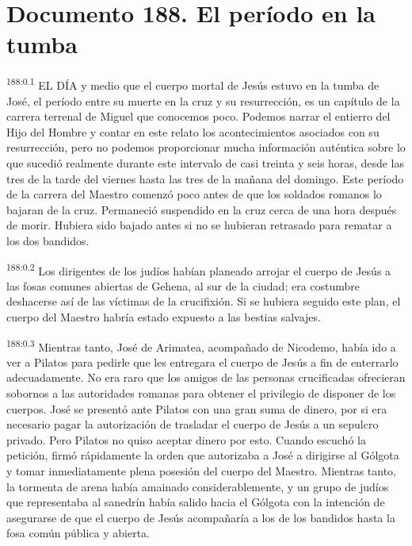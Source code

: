 \chapter{Documento 188. El período en la tumba}
\par 
\textsuperscript{188:0.1} EL DÍA y medio que el cuerpo mortal de Jesús estuvo en la tumba de José, el período entre su muerte en la cruz y su resurrección, es un capítulo de la carrera terrenal de Miguel que conocemos poco. Podemos narrar el entierro del Hijo del Hombre y contar en este relato los acontecimientos asociados con su resurrección, pero no podemos proporcionar mucha información auténtica sobre lo que sucedió realmente durante este intervalo de casi treinta y seis horas, desde las tres de la tarde del viernes hasta las tres de la mañana del domingo. Este período de la carrera del Maestro comenzó poco antes de que los soldados romanos lo bajaran de la cruz. Permaneció suspendido en la cruz cerca de una hora después de morir. Hubiera sido bajado antes si no se hubieran retrasado para rematar a los dos bandidos.

\par 
\textsuperscript{188:0.2} Los dirigentes de los judíos habían planeado arrojar el cuerpo de Jesús a las fosas comunes abiertas de Gehena, al sur de la ciudad; era costumbre deshacerse así de las víctimas de la crucifixión. Si se hubiera seguido este plan, el cuerpo del Maestro habría estado expuesto a las bestias salvajes.

\par 
\textsuperscript{188:0.3} Mientras tanto, José de Arimatea, acompañado de Nicodemo, había ido a ver a Pilatos para pedirle que les entregara el cuerpo de Jesús a fin de enterrarlo adecuadamente. No era raro que los amigos de las personas crucificadas ofrecieran sobornos a las autoridades romanas para obtener el privilegio de disponer de los cuerpos. José se presentó ante Pilatos con una gran suma de dinero, por si era necesario pagar la autorización de trasladar el cuerpo de Jesús a un sepulcro privado. Pero Pilatos no quiso aceptar dinero por esto. Cuando escuchó la petición, firmó rápidamente la orden que autorizaba a José a dirigirse al Gólgota y tomar inmediatamente plena posesión del cuerpo del Maestro. Mientras tanto, la tormenta de arena había amainado considerablemente, y un grupo de judíos que representaba al sanedrín había salido hacia el Gólgota con la intención de asegurarse de que el cuerpo de Jesús acompañaría a los de los bandidos hasta la fosa común pública y abierta.

